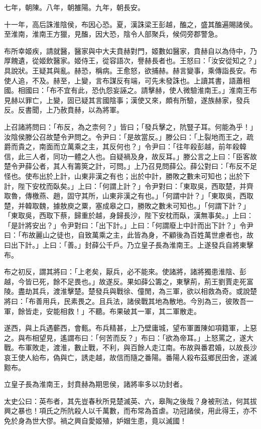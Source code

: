 \begin{pinyinscope}
七年，朝陳。八年，朝雒陽。九年，朝長安。

十一年，高后誅淮陰侯，布因心恐。夏，漢誅梁王彭越，醢之，盛其醢遍賜諸侯。至淮南，淮南王方獵，見醢，因大恐，陰令人部聚兵，候伺旁郡警急。

布所幸姬疾，請就醫，醫家與中大夫賁赫對門，姬數如醫家，賁赫自以為侍中，乃厚餽遺，從姬飲醫家。姬侍王，從容語次，譽赫長者也。王怒曰：「汝安從知之？」具說狀。王疑其與亂。赫恐，稱病。王愈怒，欲捕赫。赫言變事，乘傳詣長安。布使人追，不及。赫至，上變，言布謀反有端，可先未發誅也。上讀其書，語蕭相國。相國曰：「布不宜有此，恐仇怨妄誣之。請擊赫，使人微驗淮南王。」淮南王布見赫以罪亡，上變，固已疑其言國陰事；漢使又來，頗有所驗，遂族赫家，發兵反。反書聞，上乃赦賁赫，以為將軍。

上召諸將問曰：「布反，為之柰何？」皆曰；「發兵擊之，阬豎子耳。何能為乎！」汝陰侯滕公召故楚令尹問之。令尹曰：「是故當反。」滕公曰：「上裂地而王之，疏爵而貴之，南面而立萬乘之主，其反何也？」令尹曰：「往年殺彭越，前年殺韓信，此三人者，同功一體之人也。自疑禍及身，故反耳。」滕公言之上曰：「臣客故楚令尹薛公者，其人有籌筴之計，可問。」上乃召見問薛公。薛公對曰：「布反不足怪也。使布出於上計，山東非漢之有也；出於中計，勝敗之數未可知也；出於下計，陛下安枕而臥矣。」上曰：「何謂上計？」令尹對曰：「東取吳，西取楚，并齊取魯，傳檄燕、趙，固守其所，山東非漢之有也。」「何謂中計？」「東取吳，西取楚，并韓取魏，據敖庾之粟，塞成皋之口，勝敗之數未可知也。」「何謂下計？」「東取吳，西取下蔡，歸重於越，身歸長沙，陛下安枕而臥，漢無事矣。」上曰：「是計將安出？」令尹對曰：「出下計。」上曰：「何謂廢上中計而出下計？」令尹曰：「布故麗山之徒也，自致萬乘之主，此皆為身，不顧後為百姓萬世慮者也，故曰出下計。」上曰：「善。」封薛公千戶。乃立皇子長為淮南王。上遂發兵自將東擊布。

布之初反，謂其將曰：「上老矣，厭兵，必不能來。使諸將，諸將獨患淮陰、彭越，今皆已死，餘不足畏也。」故遂反。果如薛公籌之，東擊荊，荊王劉賈走死富陵。盡劫其兵，渡淮擊楚。楚發兵與戰徐、僮閒，為三軍，欲以相救為奇。或說楚將曰：「布善用兵，民素畏之。且兵法，諸侯戰其地為散地。今別為三，彼敗吾一軍，餘皆走，安能相救！」不聽。布果破其一軍，其二軍散走。

遂西，與上兵遇蘄西，會甀。布兵精甚，上乃壁庸城，望布軍置陳如項籍軍，上惡之。與布相望見，遙謂布曰：「何苦而反？」布曰：「欲為帝耳。」上怒罵之，遂大戰。布軍敗走，渡淮，數止戰，不利，與百餘人走江南。布故與番君婚，以故長沙哀王使人紿布，偽與亡，誘走越，故信而隨之番陽。番陽人殺布茲鄉民田舍，遂滅黥布。

立皇子長為淮南王，封賁赫為期思侯，諸將率多以功封者。

太史公曰：英布者，其先豈春秋所見楚滅英、六，皋陶之後哉？身被刑法，何其拔興之暴也！項氏之所阬殺人以千萬數，而布常為首虐。功冠諸侯，用此得王，亦不免於身為世大僇。禍之興自愛姬殖，妒媢生患，竟以滅國！


\end{pinyinscope}